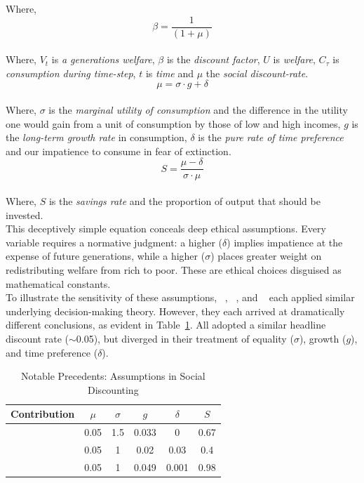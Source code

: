 \documentclass[10pt, oneside]{article}   	%
\begin{document}
Where,
\begin{equation}
\beta = \frac{1}{(1+\mu)}
\end{equation}\\

Where, $V_t$ is \emph{a generations welfare}, $\beta$ is the \emph{discount factor}, $U$ is \emph{welfare}, $C_\tau$ is \emph{consumption during time-step}, $t$ is \emph{time} and $\mu$ the \emph{social discount-rate}.\\

\begin{equation}
\mu = \sigma \cdot g + \delta
\end{equation}\\

Where, $\sigma$ is the \emph{marginal utility of consumption} and the difference in the utility one would gain from a unit of consumption by those of low and high incomes, $g$ is the \emph{long-term growth rate} in consumption, $\delta$ is the \emph{pure rate of time preference} and our impatience to consume in fear of extinction.\\

\begin{equation}
S = \frac{\mu-\delta}{\sigma \cdot \mu}
\end{equation}\\

Where, $S$ is the \emph{savings rate} and the proportion of output that should be invested.\\

This deceptively simple equation conceals deep ethical assumptions.
Every variable requires a normative judgment: a higher ($\delta$) implies impatience at the expense of future generations, while a higher ($\sigma$) places greater weight on redistributing welfare from rich to poor.
These are ethical choices disguised as mathematical constants.\\

To illustrate the sensitivity of these assumptions, ~\cite{wc1}, ~\cite{wn1}, and ~\cite{ns1} each applied similar underlying decision-making theory.
However, they each arrived at dramatically different conclusions, as evident in Table~\ref{Social contributions table}.
All adopted a similar headline discount rate ($\sim$0.05), but diverged in their treatment of equality ($\sigma$), growth ($g$), and time preference ($\delta$).\\

\begin{table}[H]
\caption{Notable Precedents: Assumptions in Social Discounting}
\begin{center}
\begin{tabular}{| l | c | c | c | c | c |}
\hline
Contribution&$\mu$&$\sigma$&$g$&$\delta$&$S$\\
\hline
~\cite{wc1}&0.05&1.5&0.033&0&0.67 \\
~\cite{wn1}&0.05&1&0.02&0.03&0.4 \\
~\cite{ns1}&0.05&1&0.049&0.001&0.98 \\
\hline
\end{tabular}
\end{center}
\label{Social contributions table}
\end{table}
\end{document}
